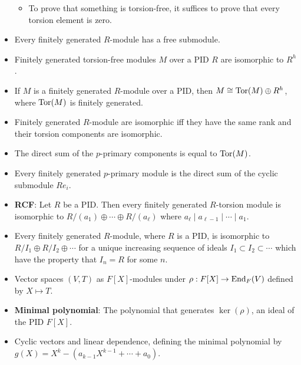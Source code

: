 \documentclass[../notes.tex]{subfiles}
\begin{document}
\begin{itemize}
    \begin{itemize}
        \item To prove that something is torsion-free, it suffices to prove that every torsion element is zero.
    \end{itemize}
    \item Every finitely generated $R$-module has a free submodule.
    \item Finitely generated torsion-free modules $M$ over a PID $R$ are isomorphic to $R^h$.
    \item If $M$ is a finitely generated $R$-module over a PID, then $M\cong\operatorname{Tor}(M)\oplus R^h$, where $\operatorname{Tor}(M)$ is finitely generated.
    \item Finitely generated $R$-module are isomorphic iff they have the same rank and their torsion components are isomorphic.
    \item The direct sum of the $p$-primary components is equal to $\operatorname{Tor}(M)$.
    \item Every finitely generated $p$-primary module is the direct sum of the cyclic submodule $Re_i$.
    \item \textbf{RCF}: Let $R$ be a PID. Then every finitely generated $R$-torsion module is isomorphic to $R/(a_1)\oplus\cdots\oplus R/(a_\ell)$ where $a_\ell\mid a_{\ell-1}\mid\cdots\mid a_1$.
    \item Every finitely generated $R$-module, where $R$ is a PID, is isomorphic to $R/I_1\oplus R/I_2\oplus\cdots$ for a unique increasing sequence of ideals $I_1\subset I_2\subset\cdots$ which have the property that $I_n=R$ for some $n$.
    \item Vector spaces $(V,T)$ as $F[X]$-modules under $\rho:F[X]\to\operatorname{End}_F(V)$ defined by $X\mapsto T$.
    \item \textbf{Minimal polynomial}: The polynomial that generates $\ker(\rho)$, an ideal of the PID $F[X]$.
    \item Cyclic vectors and linear dependence, defining the minimal polynomial by $g(X)=X^k-(a_{k-1}X^{k-1}+\cdots+a_0)$.
\end{itemize}
\end{document}
